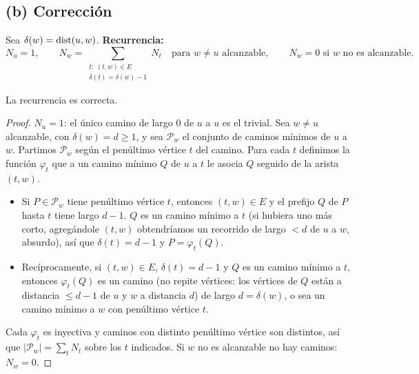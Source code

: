 \subsection*{(b) Corrección}
Sea $\delta(w)=\mathrm{dist}(u,w)$. \textbf{Recurrencia:}
\[
N_u=1,\qquad N_w=\sum_{\substack{t:\ (t,w)\in E\\ \delta(t)=\delta(w)-1}} N_t\quad\text{para } w\neq u \text{ alcanzable},
\qquad N_w=0 \text{ si } w \text{ no es alcanzable.}
\]
\begin{lema}
La recurrencia es correcta.
\end{lema}
\begin{proof}
$N_u=1$: el único camino de largo $0$ de $u$ a $u$ es el trivial. Sea $w\ne u$ alcanzable, con
$\delta(w)=d\ge1$, y sea $\mathcal{P}_w$ el conjunto de caminos mínimos de $u$ a $w$. Partimos
$\mathcal{P}_w$ según el penúltimo vértice $t$ del camino. Para cada $t$ definimos la función
$\varphi_t$ que a un camino mínimo $Q$ de $u$ a $t$ le asocia $Q$ seguido de la arista $(t,w)$.
\begin{itemize}
\item Si $P\in\mathcal{P}_w$ tiene penúltimo vértice $t$, entonces $(t,w)\in E$ y el prefijo $Q$ de $P$
hasta $t$ tiene largo $d-1$. $Q$ es un camino mínimo a $t$ (si hubiera uno más corto, agregándole
$(t,w)$ obtendríamos un recorrido de largo $<d$ de $u$ a $w$, absurdo), así que $\delta(t)=d-1$ y
$P=\varphi_t(Q)$.
\item Recíprocamente, si $(t,w)\in E$, $\delta(t)=d-1$ y $Q$ es un camino mínimo a $t$, entonces
$\varphi_t(Q)$ es un camino (no repite vértices: los vértices de $Q$ están a distancia $\le d-1$ de $u$
y $w$ a distancia $d$) de largo $d=\delta(w)$, o sea un camino mínimo a $w$ con penúltimo vértice $t$.
\end{itemize}
Cada $\varphi_t$ es inyectiva y caminos con distinto penúltimo vértice son distintos, así que
$|\mathcal{P}_w|=\sum_t N_t$ sobre los $t$ indicados. Si $w$ no es alcanzable no hay caminos: $N_w=0$.
\end{proof}

